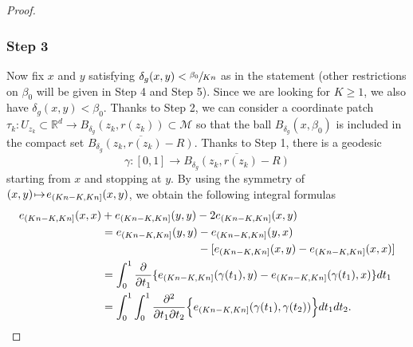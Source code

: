 \documentclass[JEP,XML,SOM,Unicode,NoEqCountersInSection,published]{cedram}
\def\mto{\mathchoice{\longmapsto}{\mapsto}{\mapsto}{\mapsto}}
\theoremstyle{theorem}
\theoremstyle{definition}
\newcommand\R{\mathbb{R}}
\begin{document}
\begin{proof}
\subsubsection*{Step 3} Now fix $x$ and $y$ satisfying $\delta_g(x,y)< \sfrac{\beta_0}{Kn}$ as in the statement (other restrictions on $\beta_0$ will be given in Step 4 and Step 5).
Since we are looking for $K\geq 1$, we also have $\delta_g(x,y)<\beta_0$.
Thanks to Step 2, we can consider a coordinate patch $\tau_{k}:U_{z_k}\subset \R^d\to B_{\delta_g}(z_k,r(z_k))\subset \mathcal{M}$ so that the ball $B_{\delta_g}(x,\beta_0)$ is included in the compact set
$\overline{B_{\delta_g}(z_k,r(z_k)-R)}$.
Thanks to Step 1, there is a geodesic
\[
\gamma:[0,1]\to \overline{B_{\delta_g}(z_k,r(z_k)-R)}
\]
starting from $x$ and stopping at $y$.
By using the symmetry of $(x,y)\!\mto\! e_{(Kn-K,Kn]}(x,y)$, we obtain the following integral formulas
\begin{equation}\label{doubl}
\begin{aligned}
e_{(Kn-K,Kn]}(x,x)&+e_{(Kn-K,Kn]}(y,y)-2e_{(Kn-K,Kn]}(x,y) \\
& = e_{(Kn-K,Kn]}(y,y)-e_{(Kn-K,Kn]}(y,x)\\
&\hspace*{3.03cm}
-[e_{(Kn-K,Kn]}(x,y)-e_{(Kn-K,Kn]}(x,x)] \\
& = \int_{0}^1 \frac{\partial }{\partial t_1}\{ e_{(Kn-K,Kn]} (\gamma(t_1),y)-e_{(Kn-K,Kn]} (\gamma(t_1),x)\} dt_1 \\ 
& = \int_{0}^1 \int_{0}^1 \frac{\partial^2 }{\partial t_1 \partial t_2}\Bigl\{ e_{(Kn-K,Kn]}(\gamma(t_1),\gamma(t_2))\Bigr\} dt_1 dt_2.
\end{aligned}
\end{equation}


\end{proof}
\end{document}
